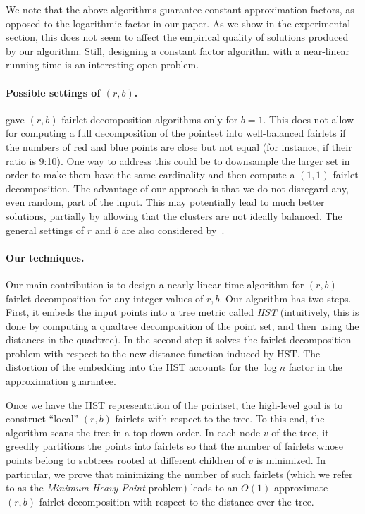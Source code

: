 We note that the above algorithms guarantee constant approximation factors, as opposed to the  logarithmic factor in our paper. As we show in the experimental section, this does not seem to affect the empirical quality of solutions produced by our algorithm. Still, designing a constant factor algorithm with a near-linear running time is an interesting open problem.

\paragraph{Possible settings of $(r,b)$.}
\cite{chierichetti2017fair} gave $(r,b)$-fairlet decomposition algorithms only for $b=1$. This does not allow for computing a full decomposition of the pointset into well-balanced fairlets if the numbers of red and blue points are close but not equal (for instance, if their ratio is 9:10). One way to address this could be to downsample the larger set in order to make them have the same cardinality and then compute a $(1,1)$-fairlet decomposition. The advantage of our approach is that we do not disregard any, even random, part of the input. This may potentially lead to much better solutions, partially by allowing that the clusters are not ideally balanced. The general settings of $r$ and $b$ are also considered by~\cite{bercea2018cost, fairclustering19}.

 
\paragraph{Our techniques.} Our main contribution is to design a nearly-linear time algorithm for $(r,b)$-fairlet decomposition for any integer values of $r,b$. 
Our algorithm has two steps. First, it embeds the input points into a  tree metric called {\em HST} (intuitively, this is done by computing a quadtree decomposition of the point set, and then using the distances in the quadtree).  In the second step it  solves the fairlet decomposition problem with respect to the new distance function induced by HST. The distortion of the  embedding into the HST accounts for the $\log n$ factor in the approximation guarantee. 

Once we have the HST representation of the pointset, the high-level goal is to construct ``local'' $(r,b)$-fairlets with respect to the tree. To this end, the algorithm scans the tree in a top-down order. In each node $v$ of the tree, it greedily partitions the points into fairlets so that the number of fairlets whose points belong to subtrees rooted at different children of $v$ is minimized. In particular, we prove that minimizing the number of such fairlets (which we refer to as the \emph{Minimum Heavy Point} problem) leads to an $O(1)$-approximate $(r,b)$-fairlet decomposition with respect to the distance over the tree.  
 